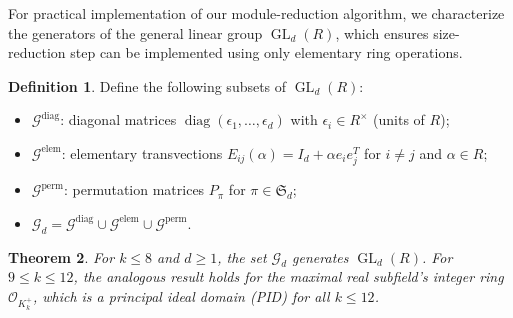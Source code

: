 \documentclass[11pt,a4paper]{article}
\theoremstyle{plain}
\newtheorem{theorem}{Theorem}[section]
\theoremstyle{definition}
\newtheorem{definition}[theorem]{Definition}
\theoremstyle{remark}
\DeclareMathOperator{\GL}{GL}
\DeclareMathOperator{\diag}{diag}
\newcommand{\cO}{\mathcal{O}}
\begin{document}
For practical implementation of our module-reduction algorithm, we characterize the generators of the general linear group $\GL_d(R)$, which ensures size-reduction step can be implemented using only elementary ring operations.

\begin{definition}\label{D:generators}
Define the following subsets of $\GL_d(R)$:
\begin{itemize}[nosep]
\item $\mathcal{G}^{\text{diag}}$: diagonal matrices $\diag(\epsilon_1,\dots,\epsilon_d)$ with $\epsilon_i\in R^\times$ (units of $R$);
\item $\mathcal{G}^{\text{elem}}$: elementary transvections $E_{ij}(\alpha)=I_d+\alpha e_i e_j^T$ for $i\neq j$ and $\alpha\in R$;
\item $\mathcal{G}^{\text{perm}}$: permutation matrices $P_\pi$ for $\pi\in\mathfrak{S}_d$;
\item $\mathcal{G}_d=\mathcal{G}^{\text{diag}} \cup \mathcal{G}^{\text{elem}} \cup \mathcal{G}^{\text{perm}}$.
\end{itemize}
\end{definition}

\begin{theorem}\label{T:gen}
For $k\le8$ and $d\ge1$, the set $\mathcal{G}_d$ generates $\GL_d(R)$. For $9\le k\le12$, the analogous result holds for the maximal real subfield's integer ring $\cO_{K_k^+}$, which is a principal ideal domain (PID) for all $k\le12$.
\end{theorem}
\end{document}
